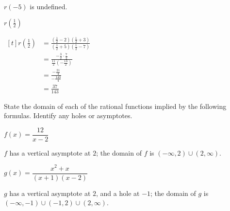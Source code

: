 \begin{exercises}
\begin{problem}
\begin{multicols}{4}
\begin{subproblem}
\begin{shortsolution}
			$r(-5)$ is undefined.
		\end{shortsolution}
	\end{subproblem}
	\begin{subproblem}
		$r\left( \frac{1}{2} \right)$
		\begin{shortsolution}
			$\begin{aligned}[t]
				r\left( \frac{1}{2} \right) & = \frac{\left( \frac{1}{2}-2 \right)\left( \frac{1}{2}+3 \right)}{\left( \frac{1}{2}+5 \right)\left( \frac{1}{2}-7 \right)} \\ 
				                            & =\frac{-\frac{3}{2}\cdot\frac{7}{2}}{\frac{11}{2}\left( -\frac{13}{2} \right)}                                              \\                                              
				                            & =\frac{-\frac{21}{4}}{-\frac{143}{4}}                                                                                       \\                                                                                       
				                            & =\frac{37}{143}                                                                                                             
			\end{aligned}$
		\end{shortsolution}
	\end{subproblem}
\end{multicols}
\end{problem}
\begin{problem}
State the domain of each of the rational functions implied by the 
following formulas. Identify any holes or asymptotes.
\begin{multicols}{3}
	\begin{subproblem}
		$f(x)=\dfrac{12}{x-2}$ 
		\begin{shortsolution}
			$f$ has a vertical asymptote at $2$; the domain of $f$ is $(-\infty,2)\cup (2,\infty)$. 
		\end{shortsolution}
	\end{subproblem}
	\begin{subproblem}
		$g(x)=\dfrac{x^2+x}{(x+1)(x-2)}$ 
		\begin{shortsolution}
			$g$ has a vertical asymptote at $2$, and a hole at $-1$; the domain of $g$ is $(-\infty,-1)\cup(-1,2)\cup(2,\infty)$. 
		\end{shortsolution}

\end{subproblem}
\end{multicols}
\end{problem}
\end{exercises}
